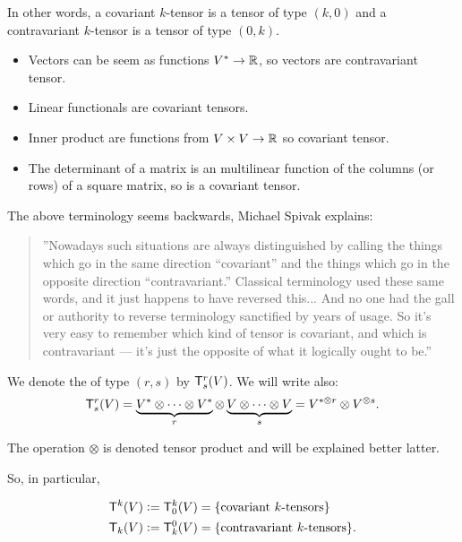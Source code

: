 In other words, a covariant $k$-tensor is a tensor of type $(k,0)$ and a contravariant $k$-tensor is a tensor of type $(0,k)$.


\begin{exa}
  \mbox{}
\begin{itemize}
\item Vectors can be seem as functions $V^*\to \mathbb{R}$, so vectors are contravariant tensor.
\item Linear functionals are covariant tensors.
\item Inner product are functions from $V\times V \to \mathbb{R}$ so covariant tensor.
\item
  The determinant of a matrix is an
 multilinear function of the
  columns (or rows) of a square matrix, so is a covariant tensor.
\end{itemize}

\end{exa}



The above terminology seems backwards, Michael Spivak explains:
\begin{quotation}
''Nowadays such situations are always distinguished by calling the things which go in the same direction “covariant” and the things which go in the opposite direction “contravariant.” Classical terminology used these same words, and it just happens to have reversed this... And no one had the gall or authority to reverse terminology sanctified by years of usage. So it’s very easy to remember which kind of tensor is covariant, and which is contravariant — it’s just the opposite of what it logically ought to be.''
\end{quotation}


\begin{df}
We  denote the   of type $(r,s)$ by $\mathsf{T}^r_s(V)$. 
We will write also:
\[ \mathsf{T}^r_s(V) =  \underbrace{ V^*\otimes \dots \otimes V^*}_{r } \otimes  \underbrace{ V\otimes \dots \otimes V}_{s} = V^{* \otimes r}\otimes V^{\otimes s}. \]
 \end{df}
 
 The  operation $\otimes$ is denoted tensor product and will be explained better latter.





So, in particular,

\begin{align*}
\mathsf{T}^k(V) := \mathsf{T}^k_0(V) & = \{\text{covariant $k$-tensors}\} \\
\mathsf{T}_k(V) := \mathsf{T}^0_k(V) & = \{\text{contravariant $k$-tensors}\}.
\end{align*}

